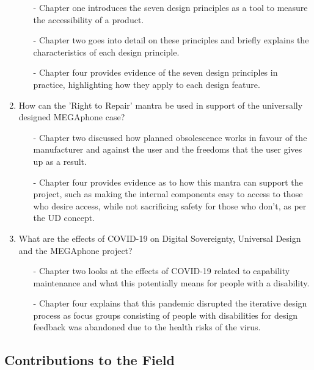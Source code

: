 \begin{enumerate}
        \begin{enumerate}
        \item[-] Chapter one introduces the seven design principles as a tool to measure the accessibility of a product.
        \item[-] Chapter two goes into detail on these principles and briefly explains the characteristics of each design principle.
        \item[-] Chapter four provides evidence of the seven design principles in practice, highlighting how they apply to each design feature.
        \end{enumerate} 
    \item How can the 'Right to Repair' mantra be used in support of the universally designed MEGAphone case?
        \begin{enumerate}
        \item[-] Chapter two discussed how planned obsolescence works in favour of the manufacturer and against the user and the freedoms that the user gives up as a result.
        \item[-] Chapter four provides evidence as to how this mantra can support the project, such as making the internal components easy to access to those who desire access, while not sacrificing safety for those who don't, as per the UD concept.
        \end{enumerate} 
    \item What are the effects of COVID-19 on Digital Sovereignty, Universal Design and the MEGAphone project?
        \begin{enumerate}
        \item[-] Chapter two looks at the effects of COVID-19 related to capability maintenance and what this potentially means for people with a disability.
        \item[-] Chapter four explains that this pandemic disrupted the iterative design process as focus groups consisting of people with disabilities for design feedback was abandoned due to the health risks of the virus.
        \end{enumerate} 
\end{enumerate}

\subsection{Contributions to the Field}

